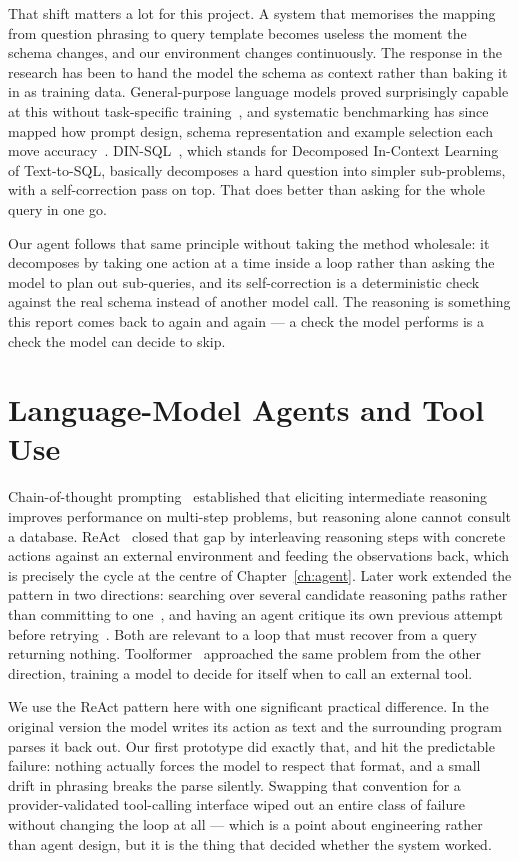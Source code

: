 That shift matters a lot for this project. A system that memorises the mapping
from question phrasing to query template becomes useless the moment the schema
changes, and our environment changes continuously. The response in the research
has been to hand the model the schema as context rather than baking it in as
training data.
General-purpose language models proved surprisingly capable at this without
task-specific training~\cite{llm_text2sql_eval}, and systematic benchmarking has
since mapped how prompt design, schema representation and example selection each
move accuracy~\cite{dailsql}.
DIN-SQL~\cite{dinsql}, which stands for Decomposed In-Context Learning of Text-to-SQL, basically decomposes a hard question into simpler sub-problems, with a self-correction pass on top. That does better than asking for the whole query in one go.

Our agent follows that same principle without taking the method wholesale: it
decomposes by taking one action at a time inside a loop rather than asking the
model to plan out sub-queries, and its self-correction is a deterministic check
against the real schema instead of another model call. The reasoning is
something this report comes back to again and again --- a check the model
performs is a check the model can decide to skip.

\section{Language-Model Agents and Tool Use}

Chain-of-thought prompting~\cite{cot} established that eliciting intermediate
reasoning improves performance on multi-step problems, but reasoning alone
cannot consult a database. ReAct~\cite{react} closed that gap by interleaving
reasoning steps with concrete actions against an external environment and
feeding the observations back, which is precisely the cycle at the centre of
Chapter~\ref{ch:agent}. Later work extended the pattern in two directions: searching over several
candidate reasoning paths rather than committing to one~\cite{tot}, and having an
agent critique its own previous attempt before retrying~\cite{reflexion}. Both are
relevant to a loop that must recover from a query returning nothing.
Toolformer~\cite{toolformer} approached the same problem
from the other direction, training a model to decide for itself when to call an
external tool.

We use the ReAct pattern here with one significant practical difference. In the
original version the model writes its action as text and the surrounding program
parses it back out. Our first prototype did exactly that, and hit the predictable
failure: nothing actually forces the model to respect that format, and a small
drift in phrasing breaks the parse silently. Swapping that convention for a
provider-validated tool-calling interface wiped out an entire class of failure
without changing the loop at all --- which is a point about engineering rather
than agent design, but it is the thing that decided whether the system worked.

